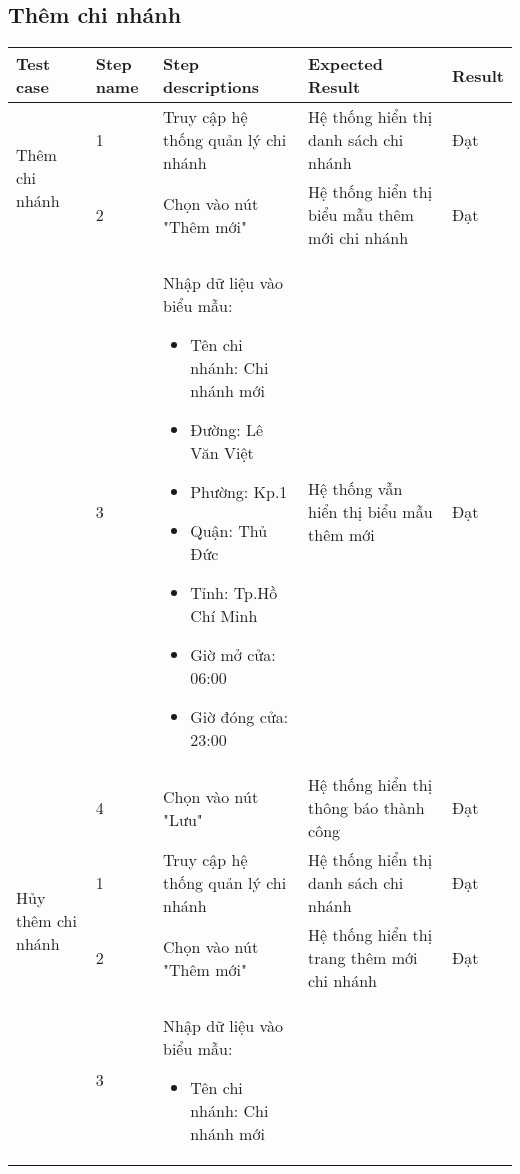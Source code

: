 \subsection{Thêm chi nhánh}
{
    \setlength\extrarowheight{6pt}
    \begin{longtable}{| p{2.5cm}| p{1cm}| p{5.5cm}| p{4.5cm} | p{1.5cm} |}
        \hline
        \textbf{Test case} & \textbf{Step name} & \textbf{Step descriptions} & \textbf{Expected Result} & \textbf{Result} \\
        \hline
        \multirow[t]{2}{2.5cm}{Thêm chi nhánh} & 1 & Truy cập hệ thống quản lý chi nhánh & Hệ thống hiển thị danh sách chi nhánh & Đạt \\
        \cline{2-5}
         & 2 & Chọn vào nút "Thêm mới" & Hệ thống hiển thị biểu mẫu thêm mới chi nhánh & Đạt \\
        \cline{2-5}
        & 3 & Nhập dữ liệu vào biểu mẫu:
        \begin{itemize}
            \item Tên chi nhánh: Chi nhánh mới
            \item Đường: Lê Văn Việt
            \item Phường: Kp.1
            \item Quận: Thủ Đức 
            \item Tỉnh: Tp.Hồ Chí Minh
            \item Giờ mở cửa: 06:00
            \item Giờ đóng cửa: 23:00
        \end{itemize} & Hệ thống vẫn hiển thị biểu mẫu thêm mới & Đạt \\
        \cline{2-5}
         & 4 & Chọn vào nút "Lưu" & Hệ thống hiển thị thông báo thành công & Đạt \\
        \hline
        \multirow[t]{2}{2.5cm}{Hủy thêm chi nhánh} & 1 & Truy cập hệ thống quản lý chi nhánh & Hệ thống hiển thị danh sách chi nhánh & Đạt \\
        \cline{2-5}
         & 2 & Chọn vào nút "Thêm mới" & Hệ thống hiển thị trang thêm mới chi nhánh & Đạt \\
        \cline{2-5}
        & 3 & Nhập dữ liệu vào biểu mẫu:
        \begin{itemize}
            \item Tên chi nhánh: Chi nhánh mới

\end{itemize}
\end{longtable}}
